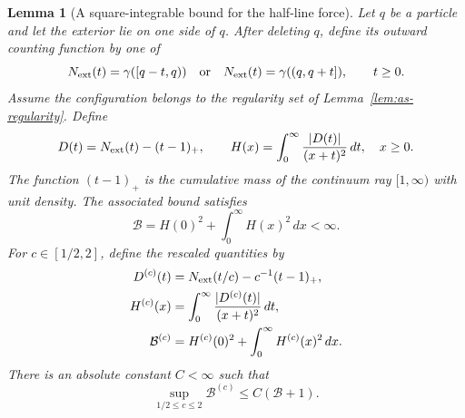 \documentclass[11pt,reqno]{amsart}
\numberwithin{equation}{section}
\newtheorem{lemma}[theorem]{Lemma}
\theoremstyle{definition}
\theoremstyle{remark}
\newcommand{\1}{\mathbf 1}
\newcommand{\dd}{\,d}
\newcommand{\calB}{\mathcal B}
\begin{document}
\begin{samepage}
\begin{lemma}[A square-integrable bound for the half-line force]\label{lem:halfline}
Let $q$ be a particle and let the exterior lie on one side of $q$.
After deleting $q$, define its outward counting function by one of
\[
N_{\rm ext}(t)=\gamma([q-t,q))
\quad\text{or}\quad
N_{\rm ext}(t)=\gamma((q,q+t]),\qquad t\ge0.
\]
Assume the configuration belongs to the regularity set of
Lemma~\ref{lem:as-regularity}. Define
\begin{equation}\label{eq:halfline-definitions}
D(t)=N_{\rm ext}(t)-(t-1)_+,\qquad
H(x)=\int_0^\infty\frac{|D(t)|}{(x+t)^2}\dd t,\quad x\ge0.
\end{equation}
The function $(t-1)_+$ is the cumulative mass of the continuum ray
$[1,\infty)$ with unit density.
The associated bound satisfies
\begin{equation}\label{eq:B}
\calB=H(0)^2+\int_0^\infty H(x)^2\dd x<\infty.
\end{equation}
For $c\in[1/2,2]$, define the rescaled quantities by
\begin{equation}\label{eq:halfline-scaled-definitions}
\begin{aligned}
D^{(c)}(t)&=N_{\rm ext}(t/c)-c^{-1}(t-1)_+,\\
H^{(c)}(x)&=\int_0^\infty\frac{|D^{(c)}(t)|}{(x+t)^2}\dd t,\\
\calB^{(c)}&=H^{(c)}(0)^2+\int_0^\infty H^{(c)}(x)^2\dd x.
\end{aligned}
\end{equation}
There is an absolute constant $C<\infty$ such that
\begin{equation}\label{eq:halfline-scale-bound}
\sup_{1/2\le c\le2}\calB^{(c)}\le C(\calB+1).
\end{equation}
\end{lemma}
\end{samepage}
\end{document}
